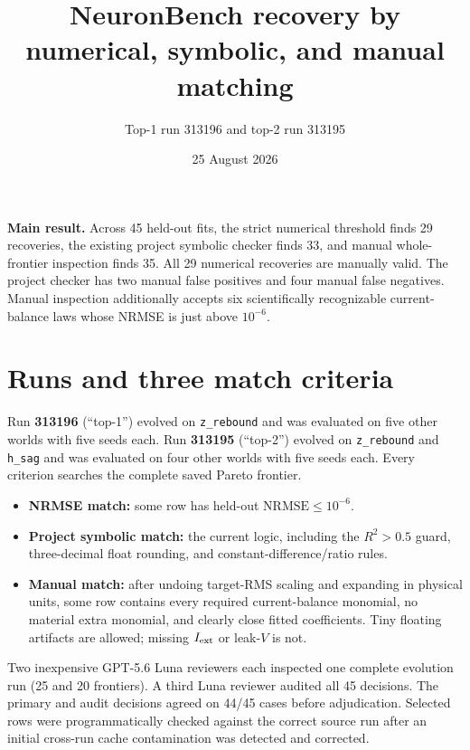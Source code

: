 \documentclass[10pt]{article}
\title{\vspace{-2em}\textcolor{accent}{\bfseries NeuronBench recovery by numerical, symbolic, and manual matching}}
\author{Top-1 run 313196 and top-2 run 313195}
\date{25 August 2026}
\newcommand{\nrmse}{\mathrm{NRMSE}}
\begin{document}
\maketitle
\vspace{-1.4em}

\colorbox{soft}{\parbox{0.965\linewidth}{
\textbf{Main result.} Across 45 held-out fits, the strict numerical threshold
finds 29 recoveries, the existing project symbolic checker finds 33, and manual
whole-frontier inspection finds 35.  All 29 numerical recoveries are manually
valid.  The project checker has two manual false positives and four manual false
negatives.  Manual inspection additionally accepts six scientifically recognizable
current-balance laws whose NRMSE is just above $10^{-6}$.
}}

\section*{Runs and three match criteria}

Run \textbf{313196} (``top-1'') evolved on \texttt{z\_rebound} and was evaluated
on five other worlds with five seeds each.  Run \textbf{313195} (``top-2'')
evolved on \texttt{z\_rebound} and \texttt{h\_sag} and was evaluated on four
other worlds with five seeds each.  Every criterion searches the complete saved
Pareto frontier.

\begin{itemize}
  \item \textbf{NRMSE match:} some row has held-out $\nrmse\le10^{-6}$.
  \item \textbf{Project symbolic match:} the current
   logic, including the $R^2>0.5$
  guard, three-decimal float rounding, and constant-difference/ratio rules.
  \item \textbf{Manual match:} after undoing target-RMS scaling and expanding in
  physical units, some row contains every required current-balance monomial, no
  material extra monomial, and clearly close fitted coefficients.  Tiny floating
  artifacts are allowed; missing $I_{\rm ext}$ or leak-$V$ is not.
\end{itemize}

Two inexpensive GPT-5.6 Luna reviewers each inspected one complete evolution run
(25 and 20 frontiers).  A third Luna reviewer audited all 45 decisions.  The
primary and audit decisions agreed on 44/45 cases before adjudication.  Selected
rows were programmatically checked against the correct source run after an initial
cross-run cache contamination was detected and corrected.
\end{document}
